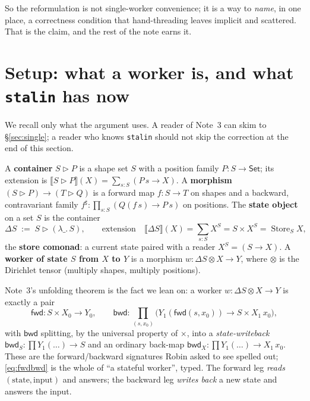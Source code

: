 \documentclass[11pt]{article}
\newcommand{\ctr}{\mathbin{\triangleright}}      %
\newcommand{\ext}[1]{\llbracket #1 \rrbracket}    %
\newcommand{\Set}{\mathsf{Set}}
\newcommand{\fwd}{\mathsf{fwd}}
\newcommand{\bwd}{\mathsf{bwd}}
\newcommand{\bk}[1]{{#1}^{\sharp}}                %
\DeclareMathOperator{\Store}{Store}
\theoremstyle{plain}
\theoremstyle{definition}
\begin{document}
So the reformulation is not single-worker convenience; it is a way to \emph{name}, in one place, a
correctness condition that hand-threading leaves implicit and scattered. That is the claim, and the
rest of the note earns it.

\section{Setup: what a worker is, and what \texttt{stalin} has now}\label{sec:setup}

We recall only what the argument uses. A reader of Note~3 can skim to \S\ref{sec:single}; a reader
who knows \texttt{stalin} should not skip the correction at the end of this section.

\begin{defbox}
A \textbf{container} $S\ctr P$ is a shape set $S$ with a position family $P:S\to\Set$; its extension
is $\ext{S\ctr P}(X)=\sum_{s:S}(P\,s\to X)$. A \textbf{morphism} $(S\ctr P)\to(T\ctr Q)$ is a forward
map $f:S\to T$ on shapes and a backward, contravariant family $\bk f:\prod_{s:S}(Q(f\,s)\to P\,s)$ on
positions. The \textbf{state object} on a set $S$ is the container
\[
  \Delta S \;:=\; S\ctr(\lambda\_.\,S),
  \qquad\text{extension}\quad
  \ext{\Delta S}(X)=\textstyle\sum_{s:S}X^{S}=S\times X^{S}=\Store_S X,
\]
the \textbf{store comonad}: a current state paired with a reader $X^{S}=(S\to X)$. A
\textbf{worker of state $S$ from $X$ to $Y$} is a morphism $w:\Delta S\otimes X\to Y$, where
$\otimes$ is the Dirichlet tensor (multiply shapes, multiply positions).
\end{defbox}

\noindent Note~3's unfolding theorem is the fact we lean on: a worker $w:\Delta S\otimes X\to Y$ is
exactly a pair
\begin{equation}\label{eq:fwdbwd}
  \fwd : S\times X_0 \to Y_0,
  \qquad
  \bwd : \textstyle\prod_{(s,x_0)}\big(Y_1(\fwd(s,x_0)) \to S\times X_1\,x_0\big),
\end{equation}
with $\bwd$ splitting, by the universal property of $\times$, into a \emph{state-writeback}
$\bwd_S:\!\prod Y_1(\dots)\to S$ and an ordinary back-map $\bwd_X:\!\prod Y_1(\dots)\to X_1\,x_0$.
These are the forward/backward signatures Robin asked to see spelled out; \eqref{eq:fwdbwd} is the
whole of ``a stateful worker'', typed. The forward leg \emph{reads} $(\text{state},\text{input})$ and
answers; the backward leg \emph{writes back} a new state and answers the input.
\end{document}

